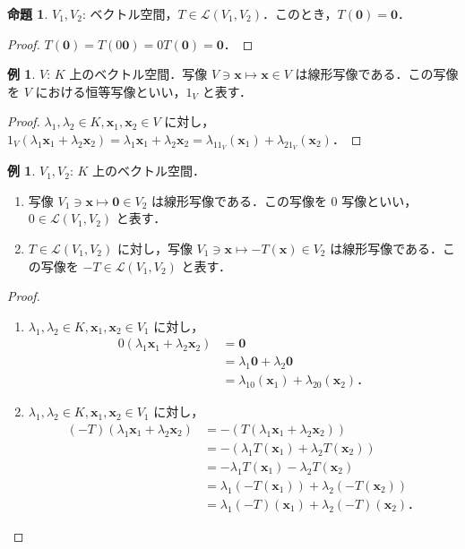 \documentclass{jlreq}
\theoremstyle{definition}
\newtheorem{prop}[thm]{命題}
\newtheorem{ex}[thm]{例}
\begin{document}
      \begin{prop}
        $V_1, V_2$: ベクトル空間，$T \in \mathcal{L}(V_1, V_2)$．このとき，$T(\bm{0})=\bm{0}$．
      \end{prop}
      \begin{proof}
        $T(\bm{0})=T(0\bm{0})=0T(\bm{0})=\bm{0}$．
      \end{proof}
      \begin{ex}
        $V$: $K$ 上のベクトル空間．写像 $V \ni \bm{x} \mapsto \bm{x} \in V$ は線形写像である．この写像を $V$ における恒等写像といい，$1_V$ と表す．
      \end{ex}
      \begin{proof}
        $\lambda_1,\lambda_2 \in K, \bm{x}_1,\bm{x}_2 \in V$ に対し，$1_V(\lambda_1\bm{x}_1+\lambda_2\bm{x}_2)=\lambda_1\bm{x}_1+\lambda_2\bm{x}_2=\lambda_11_V(\bm{x}_1)+\lambda_21_V(\bm{x}_2)$．
      \end{proof}
      \begin{ex}
        $V_1,V_2$: $K$ 上のベクトル空間．
        \begin{enumerate}
          \item 写像 $V_1 \ni \bm{x} \mapsto \bm{0} \in V_2$ は線形写像である．この写像を $0$ 写像といい，$0 \in \mathcal{L}(V_1,V_2)$ と表す．
          \item $T \in \mathcal{L}(V_1,V_2)$ に対し，写像 $V_1 \ni \bm{x} \mapsto -T(\bm{x}) \in V_2$ は線形写像である．この写像を $-T \in \mathcal{L}(V_1,V_2)$ と表す．
        \end{enumerate}
      \end{ex}
      \begin{proof}
        \mbox{}
        \begin{enumerate}
          \item $\lambda_1,\lambda_2 \in K, \bm{x}_1,\bm{x}_2 \in V_1$ に対し，
            \begin{align*}
              0(\lambda_1\bm{x}_1+\lambda_2\bm{x}_2) &= \bm{0} \\
              &= \lambda_1\bm{0}+\lambda_2\bm{0} \\
              &= \lambda_10(\bm{x}_1)+\lambda_20(\bm{x}_2)．
            \end{align*}
          \item $\lambda_1,\lambda_2 \in K, \bm{x}_1,\bm{x}_2 \in V_1$ に対し，
            \begin{align*}
              (-T)(\lambda_1\bm{x}_1+\lambda_2\bm{x}_2) &= -(T(\lambda_1\bm{x}_1+\lambda_2\bm{x}_2)) \\
              &= -(\lambda_1T(\bm{x}_1)+\lambda_2T(\bm{x}_2)) \\
              &= -\lambda_1T(\bm{x}_1)-\lambda_2T(\bm{x}_2) \\
              &= \lambda_1(-T(\bm{x}_1))+\lambda_2(-T(\bm{x}_2)) \\
              &= \lambda_1(-T)(\bm{x}_1)+\lambda_2(-T)(\bm{x}_2)．
            \end{align*}
        \end{enumerate}
      \end{proof}
\end{document}
